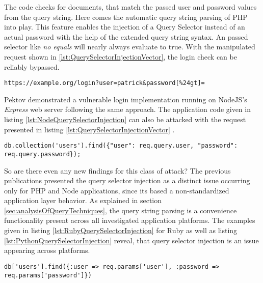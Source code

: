 The code checks for documents, that match the passed user and password values from the query string. Here comes the automatic query string parsing of PHP into play. This feature enables the injection of a Query Selector instead of an actual password with the help of the extended query string syntax. An passed selector like \emph{no equals} will nearly always evaluate to true. With the manipulated request shown in \ref{lst:QuerySelectorInjectionVector}, the login check can be reliably bypassed. \\

\begin{lstlisting}[caption={Attack vector on MongoDB for query selector injection via the query string parameter}, label={lst:QuerySelectorInjectionVector}]
https://example.org/login?user=patrick&password[%24gt]=
\end{lstlisting}

Pektov \cite{Petkov:2014a} demonstrated a vulnerable login implementation running on NodeJS's \emph{Express} web server following the same approach. The application code given in listing \ref{lst:NodeQuerySelectorInjection} can also be attacked with the request presented in listing \ref{lst:QuerySelectorInjectionVector} . \\

\begin{lstlisting}[caption={Vulnerable NodeJS example for query selector injection on MongoDB}, label={lst:NodeQuerySelectorInjection}]
db.collection('users').find({"user": req.query.user, "password": req.query.password});
\end{lstlisting}

So are there even any new findings for this class of attack? The previous publications presented the query selector injection as a distinct issue occurring only for PHP and Node applications, since its based a non-standardized application layer behavior. As explained in section \ref{sec:analysisOfQueryTechniques}, the query string parsing is a convenience functionality present across all investigated application platforms. The examples given in listing \ref{lst:RubyQuerySelectorInjection} for Ruby as well as listing \ref{lst:PythonQuerySelectorInjection} reveal, that query selector injection is an issue appearing across platforms. \\

\begin{lstlisting}[caption={Vulnerable Ruby example for query selector injection on MongoDB}, label={lst:RubyQuerySelectorInjection}]
db['users'].find({:user => req.params['user'], :password => req.params['password']})
\end{lstlisting}


